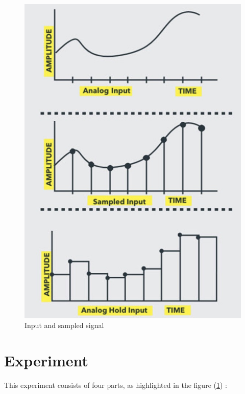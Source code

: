 \documentclass[a4paper, amsfonts, amssymb, amsmath, reprint, showkeys, nofootinbib, twoside]{revtex4-1}
\begin{document}
 \begin{figure}[H]
 	\centering
 	\includegraphics[scale=0.2]{sh} 
 	\caption{Input and sampled signal }
 	\label{1}
 \end{figure}
\section{Experiment}
This experiment consists of four parts, as highlighted in the figure (\ref{1}) :
\end{document}
